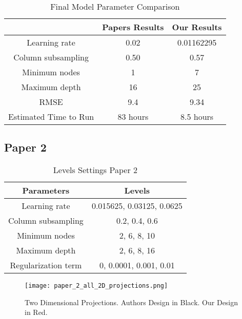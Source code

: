 \documentclass[12pt]{article}
\begin{document}
\begin{table}[!h]
 \centering
 \begin{tabular}{ | c | c | c |} 

 \hline
 & Papers Results & Our Results \\
 \hline
 Learning rate & 0.02 & 0.01162295 \\
Column subsampling & 0.50  & 0.57 \\
Minimum nodes & 1 & 7 \\
Maximum depth & 16 & 25 \\
RMSE & 9.4 &  9.34 \\
Estimated Time to Run & 83 hours & 8.5 hours \\
 \hline 
 \end{tabular}
 \caption{ Final Model Parameter Comparison }
 \end{table}

\newpage 

\subsection{Paper 2 }

\begin{table}[!h]
 \centering
 \begin{tabular}{ | c | c |} 

 \hline
 Parameters & Levels \\
 \hline
 Learning rate & 0.015625, 0.03125, 0.0625\\
Column subsampling &  0.2, 0.4, 0.6\\
Minimum nodes&  2, 6, 8, 10\\
Maximum depth&  2, 6, 8, 16\\
Regularization term &  0, 0.0001, 0.001, 0.01 \\
 \hline 
 \end{tabular}
 \caption{Levels Settings Paper 2 }
 \end{table}

\vspace*{2.5cm}

  \begin{figure}[!hbtp]
\centering
\texttt{[image: paper\_2\_all\_2D\_projections.png]}
\caption{Two Dimensional Projections. Authors Design in Black. Our Design in Red.}
\end{figure}
\end{document}
